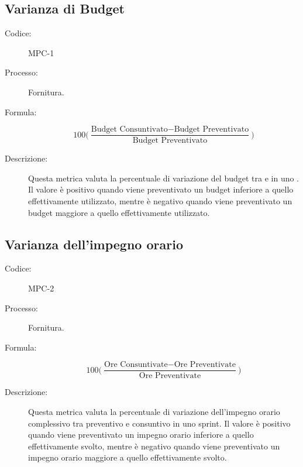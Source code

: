 \subsection{Varianza di Budget}
\begin{description}
    \item[Codice:] MPC-1
    \item[Processo:] Fornitura.
    \item[Formula:] 
    \begin{equation}
        100\biggl(\frac{\text{Budget Consuntivato} - \text{Budget Preventivato}}{\text{Budget Preventivato}}\biggr)
    \end{equation}
    \item[Descrizione:] Questa metrica valuta la percentuale di variazione del budget tra  e  in uno . Il valore è positivo quando viene preventivato un budget inferiore a quello effettivamente utilizzato, mentre è negativo quando viene preventivato un budget maggiore a quello effettivamente utilizzato.
\end{description}

\subsection{Varianza dell’impegno orario}
\begin{description}
    \item[Codice:] MPC-2
    \item[Processo:] Fornitura.
    \item[Formula:]
    \begin{equation}
        100\biggl(\frac{\text{Ore Consuntivate} - \text{Ore Preventivate}}{\text{Ore Preventivate}}\biggr)
    \end{equation}
    \item[Descrizione:] Questa metrica valuta la percentuale di variazione dell'impegno orario complessivo tra preventivo e consuntivo in uno sprint. Il valore è positivo quando viene preventivato un impegno orario inferiore a quello effettivamente svolto, mentre è negativo quando viene preventivato un impegno orario maggiore a quello effettivamente svolto.
\end{description}

